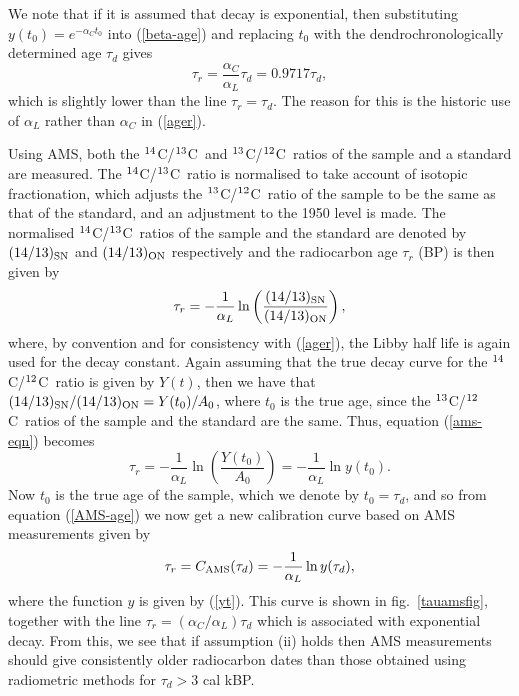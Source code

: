 \documentclass[12pt]{article}
\renewcommand{\Ref}[1]{(\ref{#1})}
\newcommand{\cft}{$^{\rm 14}$C}
\newcommand{\cth}{$^{\rm 13}$C}
\newcommand{\ctw}{$^{\rm 12}$C}
\begin{document}
We note that if it is assumed that decay is exponential,
then substituting $y(t_0)=e^{-\alpha_C t_0}$ into \Ref{beta-age} and
replacing $t_0$ with the dendrochronologically determined age $\tau_d$
gives 
$$\tau_r=\frac{\alpha_C}{\alpha_L}\tau_d=0.9717\tau_d,$$ 
which is slightly lower than the line $\tau_r=\tau_d$. The reason for this 
is the historic use of $\alpha_L$ rather than $\alpha_C$ in \Ref{ager}.

Using AMS, both the \cft/\cth~and \cth/\ctw~ratios of the sample and a
standard are measured. The \cft/\cth~ratio is normalised to take account
of isotopic fractionation, which adjusts the \cth/\ctw~ratio of the
sample to be the same as that of the standard, and an adjustment to the 1950
level is made. The normalised \cft/\cth~ratios 
of the sample and the standard are denoted by $(14/13)_{\rm SN}$ and 
$(14/13)_{\rm ON}$ respectively and the radiocarbon age $\tau_r$ (BP) is 
then given by \cite{donahue90}
\begin{equation}\label{ams-eqn}
\tau_r=-\frac{1}{\alpha_L}\ln\left(\frac{(14/13)_{\rm SN}}{(14/13)_{\rm ON}}
\right),
\end{equation}
where, by convention and for consistency with \Ref{ager}, the Libby half life
is again used for the decay constant. Again assuming that the true decay 
curve for the \cft/\ctw~ratio is given by $Y(t)$, then we have that 
$(14/13)_{\rm SN}/(14/13)_{\rm ON}=Y(t_0)/A_0$, where $t_0$ 
is the true age, since the \cth/\ctw~ratios of the sample and the standard
are the same. Thus, equation \Ref{ams-eqn} becomes
\begin{equation}\label{AMS-age}
\tau_r=-\frac{1}{\alpha_L}\ln\left(\frac{Y(t_0)}{A_0}\right)
=-\frac{1}{\alpha_L}\ln y(t_0).
\end{equation}
Now $t_0$ is the true age of the sample, which we denote by $t_0=\tau_d$,
and so from equation \Ref{AMS-age} we now get a new calibration curve
based on AMS measurements given by
\begin{equation}\label{camseqn}
\tau_r=C_{\rm AMS}(\tau_d)=-\frac{1}{\alpha_L}\ln y(\tau_d),
\end{equation}
where the function $y$ is given by \Ref{yt}. This curve is shown in 
fig.~\ref{tauamsfig},
together with the line $\tau_r=(\alpha_C/\alpha_L)\tau_d$ which is 
associated with exponential decay. From this, we see that if
assumption (ii) holds then AMS measurements should give consistently 
older radiocarbon dates than those obtained using radiometric methods for 
$\tau_d>3$ cal kBP. 
\end{document}
